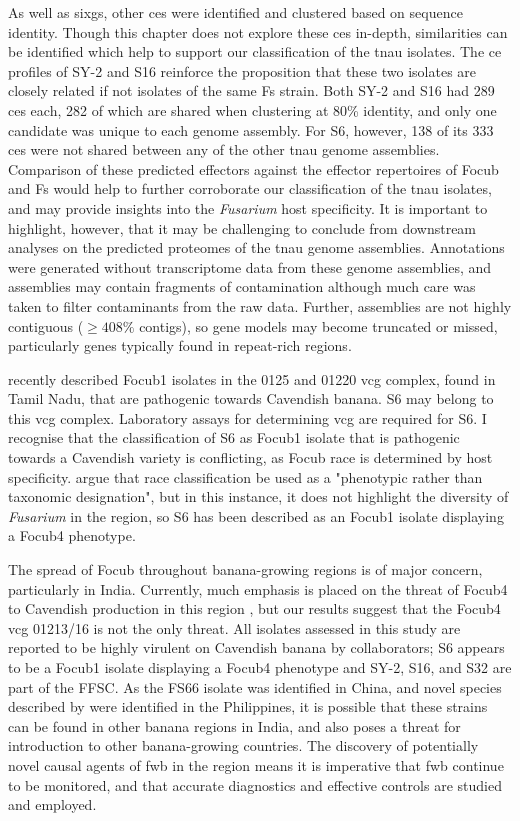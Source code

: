 As well as \acp{sixg}, other \acp{ce} were identified and clustered based on sequence identity. Though this chapter does not explore these \acp{ce} in-depth, similarities can be identified which help to support our classification of the \ac{tnau} isolates. The \ac{ce} profiles of SY-2 and S16 reinforce the proposition that these two isolates are closely related if not isolates of the same \ac{Fs} strain. Both SY-2 and S16 had 289 \acp{ce} each, 282 of which are shared when clustering at 80\% identity, and only one candidate was unique to each genome assembly. For S6, however, 138 of its 333 \acp{ce} were not shared between any of the other \ac{tnau} genome assemblies. Comparison of these predicted effectors against the effector repertoires of \ac{Focub} and \ac{Fs} would help to further corroborate our classification of the \ac{tnau} isolates, and may provide insights into the \textit{Fusarium} host specificity. It is important to highlight, however, that it may be challenging to conclude from downstream analyses on the predicted proteomes of the \ac{tnau} genome assemblies. Annotations were generated without transcriptome data from these genome assemblies, and assemblies may contain fragments of contamination although much care was taken to filter contaminants from the raw data. Further, assemblies are not highly contiguous ($ \geq408\% $ contigs), so gene models may become truncated or missed, particularly genes typically found in repeat-rich regions. 

\textcite{Thangavelu2020} recently described \ac{Focub1} isolates in the 0125 and 01220 \ac{vcg} complex, found in Tamil Nadu, that are pathogenic towards Cavendish banana. S6 may belong to this \ac{vcg} complex. Laboratory assays for determining \ac{vcg} are required for S6. I recognise that the classification of S6 as \ac{Focub1} isolate that is pathogenic towards a Cavendish variety is conflicting, as \ac{Focub} race is determined by host specificity. \textcite{Torres2021} argue that race classification be used as a "phenotypic rather than taxonomic designation", but in this instance, it does not highlight the diversity of \textit{Fusarium} in the region, so S6 has been described as an \ac{Focub1} isolate displaying a \ac{Focub4} phenotype.

The spread of \ac{Focub} throughout banana-growing regions is of major concern, particularly in India. Currently, much emphasis is placed on the threat of \ac{Focub4} to Cavendish production in this region \parencite{Viljoen2020, Damodaran2019}, but our results suggest that the \ac{Focub4} \ac{vcg} 01213/16 is not the only threat. All isolates assessed in this study are reported to be highly virulent on Cavendish banana by collaborators; S6 appears to be a \ac{Focub1} isolate displaying a \ac{Focub4} phenotype and SY-2, S16, and S32 are part of the \ac{FFSC}. As the FS66 isolate was identified in China, and novel species described by \textcite{Nozawa2023} were identified in the Philippines, it is possible that these strains can be found in other banana regions in India, and also poses a threat for introduction to other banana-growing countries. The discovery of potentially novel causal agents of \ac{fwb} in the region means it is imperative that \ac{fwb} continue to be monitored, and that accurate diagnostics and effective controls are studied and employed.  
